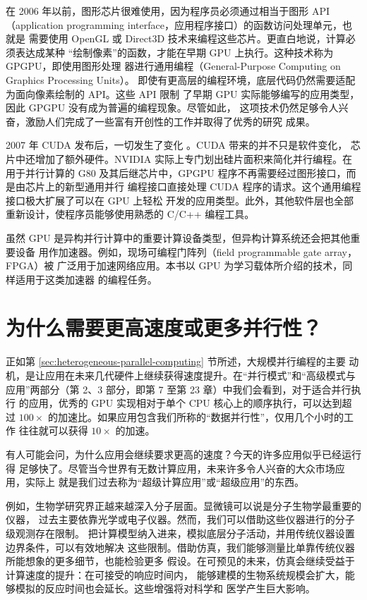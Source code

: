 在 2006 年以前，图形芯片很难使用，因为程序员必须通过相当于图形 API
（application programming interface，应用程序接口）的函数访问处理单元，也就是
需要使用 OpenGL 或 Direct3D 技术来编程这些芯片。更直白地说，计算必须表达成某种
“绘制像素”的函数，才能在早期 GPU 上执行。这种技术称为 GPGPU，即使用图形处理
器进行通用编程（General-Purpose Computing on Graphics Processing Units）。
即使有更高层的编程环境，底层代码仍然需要适配为面向像素绘制的 API。这些 API 限制
了早期 GPU 实际能够编写的应用类型，因此 GPGPU 没有成为普遍的编程现象。尽管如此，
这项技术仍然足够令人兴奋，激励人们完成了一些富有开创性的工作并取得了优秀的研究
成果。

2007 年 CUDA 发布后，一切发生了变化 \cite{cuda2025}。CUDA 带来的并不只是软件变化，
芯片中还增加了额外硬件。NVIDIA 实际上专门划出硅片面积来简化并行编程。在用于并行计算的 G80
及其后继芯片中，GPGPU 程序不再需要经过图形接口，而是由芯片上的新型通用并行
编程接口直接处理 CUDA 程序的请求。这个通用编程接口极大扩展了可以在 GPU 上轻松
开发的应用类型。此外，其他软件层也全部重新设计，使程序员能够使用熟悉的 C/C++
编程工具。

虽然 GPU 是异构并行计算中的重要计算设备类型，但异构计算系统还会把其他重要设备
用作加速器。例如，现场可编程门阵列（field programmable gate array，FPGA）被
广泛用于加速网络应用。本书以 GPU 为学习载体所介绍的技术，同样适用于这类加速器
的编程任务。

\section{为什么需要更高速度或更多并行性？}
\label{sec:why-more-speed}

正如第 \ref{sec:heterogeneous-parallel-computing} 节所述，大规模并行编程的主要
动机，是让应用在未来几代硬件上继续获得速度提升。在“并行模式”和“高级模式与
应用”两部分（第 2、3 部分，即第 7 至第 23 章）中我们会看到，对于适合并行执行
的应用，优秀的 GPU 实现相对于单个 CPU 核心上的顺序执行，可以达到超过
$100\times$ 的加速比。如果应用包含我们所称的“数据并行性”，仅用几个小时的工作
往往就可以获得 $10\times$ 的加速。

有人可能会问，为什么应用会继续要求更高的速度？今天的许多应用似乎已经运行得
足够快了。尽管当今世界有无数计算应用，未来许多令人兴奋的大众市场应用，实际上
就是我们过去称为“超级计算应用”或“超级应用”的东西。

例如，生物学研究界正越来越深入分子层面。显微镜可以说是分子生物学最重要的仪器，
过去主要依靠光学或电子仪器。然而，我们可以借助这些仪器进行的分子级观测存在限制。
把计算模型纳入进来，模拟底层分子活动，并用传统仪器设置边界条件，可以有效地解决
这些限制。借助仿真，我们能够测量比单靠传统仪器所能想象的更多细节，也能检验更多
假设。在可预见的未来，仿真会继续受益于计算速度的提升：在可接受的响应时间内，
能够建模的生物系统规模会扩大，能够模拟的反应时间也会延长。这些增强将对科学和
医学产生巨大影响。

